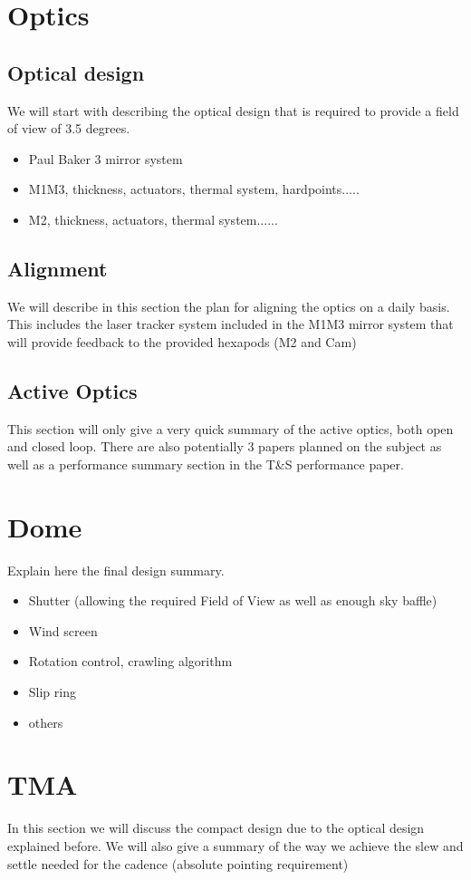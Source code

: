 \section{Optics}
\subsection{Optical design}
We will start with describing the optical design that is required to provide a field of view of 3.5 degrees.
\begin{itemize}
\item Paul Baker 3 mirror system
\item M1M3, thickness, actuators, thermal system, hardpoints.....
\item M2, thickness, actuators, thermal system......
\end{itemize}

\subsection{Alignment}
We will describe in this section the plan for aligning the optics on a daily basis. This includes the laser tracker system included in the M1M3 mirror system that will provide feedback to the provided hexapods (M2 and Cam)

\subsection{Active Optics}
This section will only give a very quick summary of the active optics, both open and closed loop. There are also potentially 3 papers planned on the subject as well as a performance summary section in the T\&S performance paper. 

\section{Dome}
Explain here the final design summary. 
\begin{itemize}
\item Shutter (allowing the required Field of View as well as enough sky baffle)
\item Wind screen
\item Rotation control, crawling algorithm
\item Slip ring
\item others
\end{itemize}
\section{TMA}
In this section we will discuss the compact design due to the optical design explained before. 
We will also give a summary of the way we achieve the slew and settle needed for the cadence (absolute pointing requirement)
